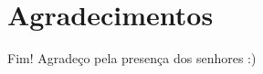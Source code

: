 \section*{Agradecimentos}

\begin{frame}
	\begin{block}{Fim!}
		Agradeço pela presença dos senhores :)
	\end{block}
\end{frame}
